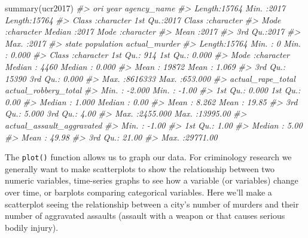 \documentclass[
  12pt,
  openany]{book}
\newenvironment{Shaded}{\begin{snugshade}}{\end{snugshade}}
\newcommand{\CommentTok}[1]{\textcolor[rgb]{0.37,0.37,0.37}{\textit{#1}}}
\newcommand{\FunctionTok}[1]{\textcolor[rgb]{0,0,0}{#1}}
\newcommand{\NormalTok}[1]{#1}
\begin{document}
\begin{Shaded}
\begin{Highlighting}[]
\FunctionTok{summary}\NormalTok{(ucr2017)}
\CommentTok{\#\textgreater{}      ori                 year      agency\_name       }
\CommentTok{\#\textgreater{}  Length:15764       Min.   :2017   Length:15764      }
\CommentTok{\#\textgreater{}  Class :character   1st Qu.:2017   Class :character  }
\CommentTok{\#\textgreater{}  Mode  :character   Median :2017   Mode  :character  }
\CommentTok{\#\textgreater{}                     Mean   :2017                     }
\CommentTok{\#\textgreater{}                     3rd Qu.:2017                     }
\CommentTok{\#\textgreater{}                     Max.   :2017                     }
\CommentTok{\#\textgreater{}     state             population      actual\_murder    }
\CommentTok{\#\textgreater{}  Length:15764       Min.   :      0   Min.   :  0.000  }
\CommentTok{\#\textgreater{}  Class :character   1st Qu.:    914   1st Qu.:  0.000  }
\CommentTok{\#\textgreater{}  Mode  :character   Median :   4460   Median :  0.000  }
\CommentTok{\#\textgreater{}                     Mean   :  19872   Mean   :  1.069  }
\CommentTok{\#\textgreater{}                     3rd Qu.:  15390   3rd Qu.:  0.000  }
\CommentTok{\#\textgreater{}                     Max.   :8616333   Max.   :653.000  }
\CommentTok{\#\textgreater{}  actual\_rape\_total  actual\_robbery\_total}
\CommentTok{\#\textgreater{}  Min.   :  {-}2.000   Min.   :   {-}1.00    }
\CommentTok{\#\textgreater{}  1st Qu.:   0.000   1st Qu.:    0.00    }
\CommentTok{\#\textgreater{}  Median :   1.000   Median :    0.00    }
\CommentTok{\#\textgreater{}  Mean   :   8.262   Mean   :   19.85    }
\CommentTok{\#\textgreater{}  3rd Qu.:   5.000   3rd Qu.:    4.00    }
\CommentTok{\#\textgreater{}  Max.   :2455.000   Max.   :13995.00    }
\CommentTok{\#\textgreater{}  actual\_assault\_aggravated}
\CommentTok{\#\textgreater{}  Min.   :   {-}1.00         }
\CommentTok{\#\textgreater{}  1st Qu.:    1.00         }
\CommentTok{\#\textgreater{}  Median :    5.00         }
\CommentTok{\#\textgreater{}  Mean   :   49.98         }
\CommentTok{\#\textgreater{}  3rd Qu.:   21.00         }
\CommentTok{\#\textgreater{}  Max.   :29771.00}
\end{Highlighting}
\end{Shaded}

The \texttt{plot()} function allows us to graph our data. For criminology research we generally want to make scatterplots to show the relationship between two numeric variables, time-series graphs to see how a variable (or variables) change over time, or barplots comparing categorical variables. Here we'll make a scatterplot seeing the relationship between a city's number of murders and their number of aggravated assaults (assault with a weapon or that causes serious bodily injury).
\end{document}
